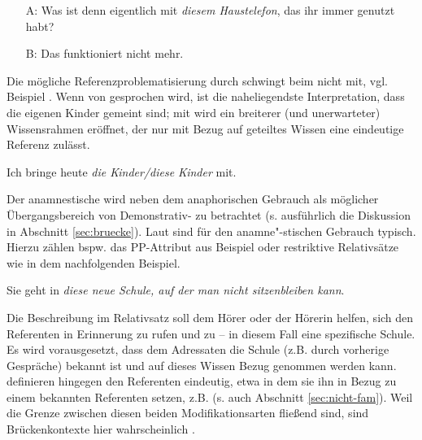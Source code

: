 \begin{exe}
	\ex \label{ex:auer} 
	\begin{itemize}
		\item[A:] Was ist denn eigentlich mit \textit{diesem Haustelefon}, das ihr immer genutzt habt? 
		\item[B:] Das funktioniert nicht mehr. 
	\end{itemize}
\end{exe}

Die mögliche Referenzproblematisierung durch  schwingt beim  nicht mit, vgl. Beispiel  \parencites()()[][80]{Bisle-Muller1991}[][70]{Himmelmann1997}. Wenn von  gesprochen wird, ist die naheliegendste Interpretation, dass die eigenen Kinder gemeint sind; mit  wird ein breiterer (und unerwarteter) Wissensrahmen eröffnet, der nur mit Bezug auf geteiltes Wissen eine eindeutige Referenz zulässt.    

\begin{exe}
	\ex \label{ex:kinder} Ich bringe heute \textit{die Kinder/diese Kinder} mit.   
\end{exe}

Der anamnestische  wird neben dem anaphorischen  Gebrauch als möglicher Übergangsbereich von Demonstrativ- zu  betrachtet (s. ausführlich die Diskussion in Abschnitt \ref{sec:bruecke}). Laut \textcite[73]{Himmelmann1997} sind für den anamne"-stischen Gebrauch  typisch. Hierzu zählen bspw. das PP-Attribut  aus Beispiel  oder restriktive Relativsätze wie in dem nachfolgenden Beispiel.

\begin{exe}
	\ex \label{ex:film} Sie geht in \textit{diese neue Schule, auf der man nicht sitzenbleiben kann}.    
\end{exe}
\noindent 
Die Beschreibung im Relativsatz soll dem Hörer oder der Hörerin helfen, sich den Referenten in Erinnerung zu rufen und zu   -- in diesem Fall eine spezifische Schule. Es wird vorausgesetzt, dass dem Adressaten die Schule (z.B. durch vorherige Gespräche) bekannt ist und auf dieses Wissen Bezug genommen werden kann.   definieren hingegen den Referenten eindeutig, etwa in dem sie ihn in Bezug zu einem bekannten Referenten setzen, z.B.  (s. auch Abschnitt \ref{sec:nicht-fam}). Weil die Grenze zwischen diesen beiden Modifikationsarten fließend sind, sind Brückenkontexte  hier wahrscheinlich \parencite[s. zur ausführlichen Diskussion][79--80]{Himmelmann1997}. 

